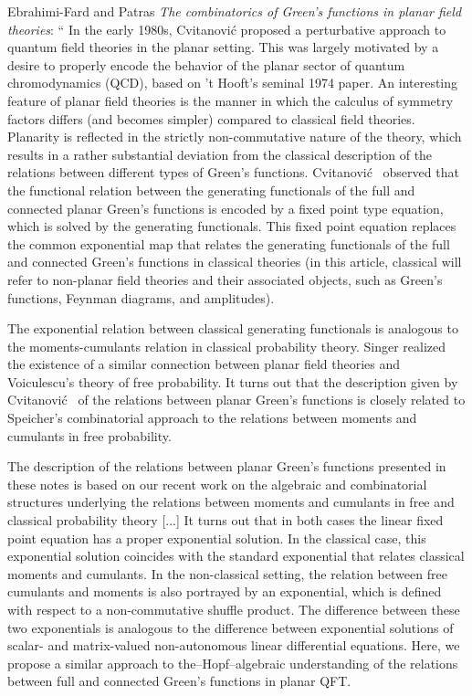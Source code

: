 \begin{description}
Ebrahimi-Fard and Patras
{\em The combinatorics of {Green}'s functions in planar field theories}:
`` In the early 1980s, Cvitanovi\'c \etal{} proposed
a perturbative approach to quantum field theories in the planar setting.
This was largely motivated by a desire to properly encode the behavior of
the planar sector of quantum chromodynamics (QCD), based on 't Hooft's
seminal 1974 paper. An interesting feature of planar
field theories is the manner in which the calculus of symmetry factors
differs (and becomes simpler) compared to classical field theories.
Planarity is reflected in the strictly non-commutative nature of the
theory, which results in a rather substantial deviation from the
classical description of the relations between different types of Green's
functions. Cvitanovi\'c \etal\ observed that the functional relation
between the generating functionals of the full and connected planar
Green's functions is encoded by a fixed point type equation, which is
solved by the generating functionals. This fixed point equation replaces
the common exponential map that relates the generating functionals of the
full and connected Green's functions in classical theories (in this
article, classical will refer to non-planar field theories and their
associated objects, such as Green's functions, Feynman diagrams, and
amplitudes).

The exponential relation between classical generating functionals is
analogous to the moments-cumulants relation in classical probability
theory. Singer realized the existence of a similar connection
between planar field theories and Voiculescu's theory of free
probability. It turns out that the description given by
Cvitanovi\'c \etal\  of the relations between planar Green's functions is
closely related to Speicher's combinatorial approach to the relations
between moments and cumulants in free probability.

The description of the relations between planar Green's functions
presented in these notes is based on our recent work on the algebraic and
combinatorial structures underlying the relations between moments and
cumulants in free and classical probability theory
[...]
It turns out that in both cases the linear fixed point equation has a
proper exponential solution. In the classical case, this exponential
solution coincides with the standard exponential that relates classical
moments and cumulants. In the non-classical setting, the relation between
free cumulants and moments is also portrayed by an exponential, which is
defined with respect to a non-commutative shuffle product. The difference
between these two exponentials is analogous to the difference between
exponential solutions of scalar- and matrix-valued non-autonomous linear
differential equations. Here, we propose a similar approach to
the–Hopf–algebraic understanding of the relations between full and
connected Green’s functions in planar QFT.


\end{description}
